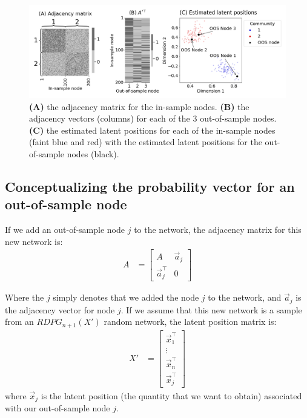 \begin{figure}[h]
    \centering
    \includegraphics[width=\linewidth]{applications/ch7/Images/oos_ex.png}
    \caption[Out of sample embedding example]{\textbf{(A)} the adjacency matrix for the in-sample nodes. \textbf{(B)} the adjacency vectors (columns) for each of the $3$ out-of-sample nodes. \textbf{(C)} the estimated latent positions for each of the in-sample nodes (faint blue and red) with the estimated latent positions for the out-of-sample nodes (black).}
    \label{fig:ch7:oos:ex}
\end{figure}

\subsection{Conceptualizing the probability vector for an out-of-sample node}

If we add an out-of-sample node $j$ to the network, the adjacency matrix for this new network is:
\begin{align*}
    A &= \begin{bmatrix}
        A & \vec a_j \\
        \vec a_j^\top & 0
    \end{bmatrix}
\end{align*}

Where the $j$ simply denotes that we added the node $j$ to the network, and $\vec a_j$ is the adjacency vector for node $j$. If we assume that this new network is a sample from an $RDPG_{n+1}(X')$ random network, the latent position matrix is:
\begin{align*}
    X' &= \begin{bmatrix}
        \vec x_1^\top \\
        \vdots\\
        \vec x_n^\top \\
        \vec x_j^\top
    \end{bmatrix}
\end{align*}
where $\vec x_j$ is the latent position (the quantity that we want to obtain) associated with our out-of-sample node $j$.

